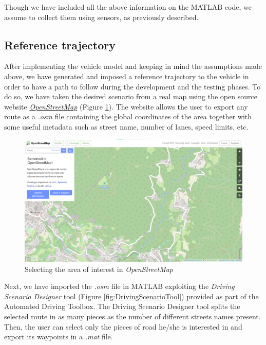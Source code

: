 Though we have included all the above information on the MATLAB code, we assume to collect them using sensors, as previously described.








\subsection{Reference trajectory}
After implementing the vehicle model and keeping in mind the assumptions made above, we have generated and imposed a reference trajectory to the vehicle in order to have a path to follow during the development and the testing phases.
To do so, we have taken the desired scenario from a real map using the open source website \href{https://www.openstreetmap.org}{\textit{OpenStreetMap}}\cite{OpenStreetMap} (Figure \ref{fig:OpenStreetMap}).
The website allows the user to export any route as a \textit{.osm} file containing the global coordinates of the area together with some useful metadata such as street name, number of lanes, speed limits, etc.

\begin{figure}[H]
    \centering
    \includegraphics[width=1\textwidth]{Figures/OpenStreetMap.png}
    \caption{Selecting the area of interest in \textit{OpenStreetMap}}
      \label{fig:OpenStreetMap}
\end{figure}

Next, we have imported the \textit{.osm} file in MATLAB exploiting the \textit{Driving Scenario Designer} tool (Figure \ref{fig:DrivingScenarioTool}) provided as part of the Automated Driving Toolbox. The Driving Scenario Designer tool splits the selected route in as many pieces as the number of different streets names present. Then, the user can select only the pieces of road he/she is interested in and export its waypoints in a \textit{.mat} file.

